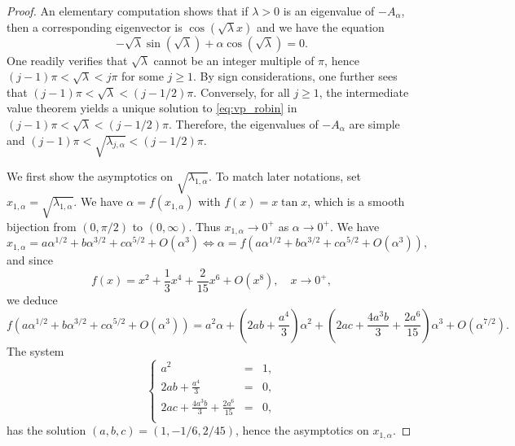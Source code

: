 \documentclass[10pt]{article}
\begin{document}
\begin{proof}
An elementary computation shows that if $\lambda > 0$ is an eigenvalue of $-A_\alpha$, then a corresponding eigenvector is $\cos(\sqrt{\lambda}x)$ and we have the equation 
\begin{equation}\label{eq:vp_robin}
    - \sqrt{\lambda} \sin(\sqrt{\lambda}) + \alpha \cos(\sqrt{\lambda}) = 0. 
\end{equation}
One readily verifies that $\sqrt{\lambda}$ cannot be an integer multiple of $\pi$, hence $(j-1) \pi < \sqrt{\lambda} < j\pi$ for some $j \geq 1$. By sign considerations, one further sees that $(j-1) \pi < \sqrt{\lambda} < (j-1/2)\pi$. Conversely, for all $j \geq 1$, the intermediate value theorem yields a unique solution to \eqref{eq:vp_robin} in $(j-1) \pi < \sqrt{\lambda} < (j-1/2)\pi$. Therefore, the eigenvalues of $-A_\alpha$ are simple and $(j-1) \pi < \sqrt{\lambda_{j,\alpha}} < (j-1/2)\pi$. 

We first show the asymptotics on $\sqrt{\lambda_{1,\alpha}}$. To match later notations, set $x_{1,\alpha}=\sqrt{\lambda_{1,\alpha}}$. We have $\alpha = f(x_{1,\alpha})$ with $f(x) = x \tan x$, which is a smooth bijection from $(0,\pi/2)$ to $(0,\infty)$. Thus $x_{1,\alpha} \to 0^+$ as $\alpha \to 0^+$. We have 
\[
x_{1,\alpha} = a\alpha^{1/2} +b\alpha^{3/2} +c \alpha^{5/2} + O(\alpha^3) \Longleftrightarrow \alpha = f\left( a\alpha^{1/2} +b\alpha^{3/2} +c \alpha^{5/2} + O(\alpha^3) \right),
\]
and since   
\[
f(x) = x^2 + \frac{1}{3}x^4 + \frac{2}{15} x^6 + O(x^8) ,\quad x \to 0^+,
\]
we deduce 
\[
f\left( a\alpha^{1/2} +b\alpha^{3/2} +c \alpha^{5/2} + O(\alpha^3) \right) = a^2 \alpha + \left(2ab + \frac{a^4}{3}\right)\alpha^2 + \left(2ac + \frac{4a^3b}{3} + \frac{2a^6}{15}\right) \alpha^3 + O(\alpha^{7/2}).
\]
The system 
\[
\left\lbrace \begin{array}{lcc}
a^2 &=& 1,\\
\displaystyle 2ab + \frac{a^4}{3} &=& 0, \\
\displaystyle 2ac + \frac{4a^3b}{3} + \frac{2a^6}{15} &=& 0, \\
\end{array}\right.
\]
has the solution $(a,b,c) = (1,-1/6,2/45)$, hence the asymptotics on $x_{1,\alpha}$. 



\end{proof}
\end{document}
